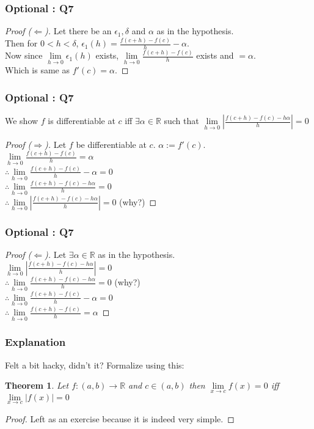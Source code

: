 \documentclass[handout,aspectratio=169]{beamer}
\newtheorem{thm}{Theorem}
\newcommand{\bR}{\mathbb{R}}
\begin{document}
\begin{frame}
\frametitle{Optional : Q7}
\begin{proof}[Proof ($\Leftarrow$)]
Let there be an $\epsilon_1, \delta$ and $\alpha$ as in the hypothesis.\\ \pause
Then for $0<h<\delta$, $\epsilon_1(h) = \frac{f(c+h)-f(c)}{h} - \alpha$.\\ \pause
Now since $\lim\limits_{h\to 0}\epsilon_1(h)$ exists, $\lim\limits_{h\to 0} \frac{f(c+h)-f(c)}{h}$ exists and $=\alpha$.\\ \pause
Which is same as $f'(c) = \alpha$.
\end{proof}
\end{frame}

\begin{frame}
\frametitle{Optional : Q7}
We show $f$ is differentiable at $c$ iff $\exists \alpha \in \bR$ such that $\lim\limits_{h\to 0} \left| \frac{f(c+h)-f(c)-h\alpha}{h} \right| = 0$
\pause
\begin{proof}[Proof ($\Rightarrow$)]
Let $f$ be differentiable at $c$. $\alpha := f'(c)$.\\ \pause
$\lim\limits_{h\to 0} \frac{f(c+h)-f(c)}{h} = \alpha$ \\ \pause
$\therefore \lim\limits_{h\to 0} \frac{f(c+h)-f(c)}{h} - \alpha = 0$ \\ \pause
$\therefore \lim\limits_{h\to 0} \frac{f(c+h)-f(c)-h\alpha}{h} = 0$ \\ \pause
$\therefore \lim\limits_{h\to 0} \left| \frac{f(c+h)-f(c)-h\alpha}{h} \right| = 0$ (why?) 
\end{proof}
\end{frame}

\begin{frame}
\frametitle{Optional : Q7}
\begin{proof}[Proof ($\Leftarrow$)]
Let $\exists \alpha \in \bR$ as in the hypothesis.\\ \pause
$\lim\limits_{h\to 0} \left| \frac{f(c+h)-f(c)-h\alpha}{h} \right| = 0$ \\ \pause
$\therefore \lim\limits_{h\to 0} \frac{f(c+h)-f(c)-h\alpha}{h} = 0$ (why?) \\ \pause
$\therefore \lim\limits_{h\to 0} \frac{f(c+h)-f(c)}{h} - \alpha = 0$ \\ \pause
$\therefore \lim\limits_{h\to 0} \frac{f(c+h)-f(c)}{h} = \alpha$ 
\end{proof}
\end{frame}

\begin{frame}
\frametitle{Explanation}
Felt a bit hacky, didn't it? Formalize using this:
\begin{thm}
Let $f : (a,b) \to \bR$ and $c\in(a,b)$ then $\lim\limits_{x\to c} f(x) = 0$ iff $\lim\limits_{x\to c} |f(x)| = 0$
\end{thm}
\pause
\begin{proof}
Left as an exercise because it is indeed very simple.
\end{proof}
\end{frame}
\end{document}
